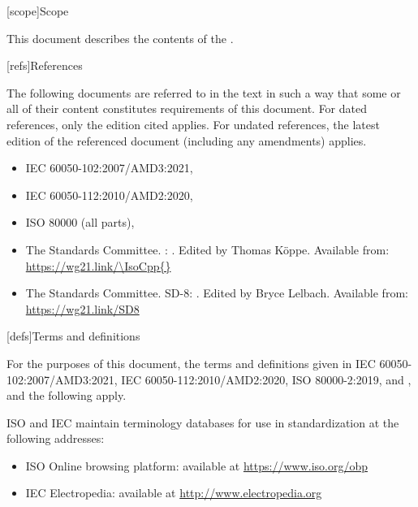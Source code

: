 

[scope]{Scope}

\pnum
{}%
This document describes the contents of the .


[refs]{References}

\pnum
{}%
The following documents are referred to in the text
in such a way that some or all of their content
constitutes requirements of this document.
For dated references, only the edition cited applies.
For undated references,
the latest edition of the referenced document
(including any amendments) applies.
\begin{itemize}
\item
IEC 60050-102:2007/AMD3:2021,
\item
IEC 60050-112:2010/AMD2:2020,
\item
ISO 80000 (all parts), 
\item
The \Cpp{} Standards Committee.
\IsoCpp{}: .
Edited by Thomas K\"{o}ppe.
Available from: \url{https://wg21.link/\IsoCpp{}}
\item
The \Cpp{} Standards Committee.
SD-8: .
Edited by Bryce Lelbach.
Available from: \url{https://wg21.link/SD8}
\end{itemize}


[defs]{Terms and definitions}

\pnum
{}%
For the purposes of this document,
the terms and definitions given in
IEC 60050-102:2007/AMD3:2021,
IEC 60050-112:2010/AMD2:2020,
ISO 80000-2:2019,
and
\IsoCpp{},
and the following apply.

\pnum
ISO and IEC maintain terminology databases
for use in standardization
at the following addresses:
\begin{itemize}
\item ISO Online browsing platform: available at \url{https://www.iso.org/obp}
\item IEC Electropedia: available at \url{http://www.electropedia.org}
\end{itemize}


